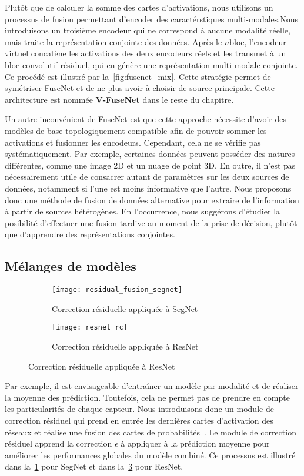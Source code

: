 Plutôt que de calculer la somme des cartes d'activations, nous utilisons un processus de fusion permettant d'encoder des caractérstiques multi-modales.Nous introduisons un troisième encodeur qui ne correspond à aucune modalité réelle, mais traite la représentation conjointe des données. Après le $n$\ieme bloc, l'encodeur virtuel concatène les activations des deux encodeurs réels et les transmet à un bloc convolutif résiduel, qui en génère une représentation multi-modale conjointe. Ce procédé est illustré par la~\cref{fig:fusenet_mix}. Cette stratégie permet de symétriser FuseNet et de ne plus avoir à choisir de source principale. Cette architecture est nommée \textbf{V-FuseNet} dans le reste du chapitre.

Un autre inconvénient de FuseNet est que cette approche nécessite d'avoir des modèles de base topologiquement compatible afin de pouvoir sommer les activations et fusionner les encodeurs. Cependant, cela ne se vérifie pas systématiquement. Par exemple, certaines données peuvent posséder des natures différentes, comme une image 2D et un nuage de point 3D. En outre, il n'est pas nécessairement utile de consacrer autant de paramètres sur les deux sources de données, notamment si l'une est moins informative que l'autre. Nous proposons donc une méthode de fusion de données alternative pour extraire de l'information à partir de sources hétérogènes. En l'occurrence, nous suggérons d'étudier la posibilité d'effectuer une fusion tardive au moment de la prise de décision, plutôt que d'apprendre des représentations conjointes.

\subsection{Mélanges de modèles}

\begin{figure}[h]
   \begin{subfigure}{0.5\textwidth}
     \texttt{[image: residual\_fusion\_segnet]}
     \caption{Correction résiduelle appliquée à SegNet}
     \label{fig:residual_correction}
   \end{subfigure}
   \begin{subfigure}{0.5\textwidth}
     \texttt{[image: resnet\_rc]}
     \caption{Correction résiduelle appliquée à ResNet}
     \label{fig:residual_correction_resnet}
   \end{subfigure}
\end{figure}

Par exemple, il est envisageable d'entraîner un modèle par modalité et de réaliser la moyenne des prédiction. Toutefois, cela ne permet pas de prendre en compte les particularités de chaque capteur. Nous introduisons donc un module de correction résiduel qui prend en entrée les dernières cartes d'activation des réseaux et réalise une fusion des cartes de probabilités~\cite{audebert_semantic_2016}. Le module de correction résiduel apprend la correction $\epsilon$ à appliquer à la prédiction moyenne pour améliorer les performances globales du modèle combiné. Ce processus est illustré dans la~\cref{fig:residual_correction} pour SegNet et dans la~\cref{fig:residual_correction_resnet} pour ResNet.


